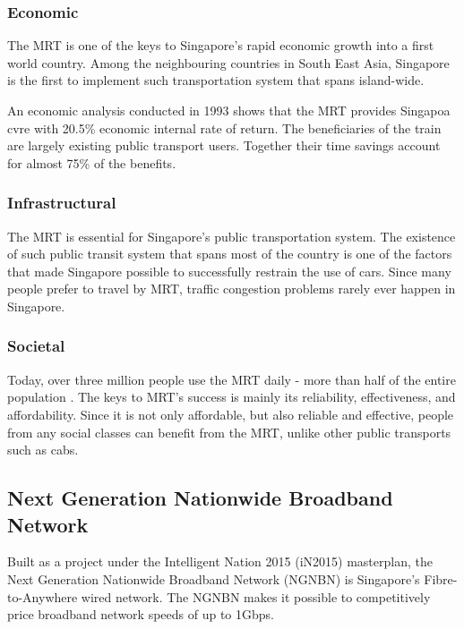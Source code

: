 \documentclass[a4paper,10pt]{article}
\begin{document}
\subsubsection{Economic}
The MRT is one of the keys to Singapore's rapid economic growth into a first world country. Among the neighbouring countries in South East Asia, Singapore is the first to implement such transportation system that spans island-wide.

An economic analysis\cite{fouracre1993mass} conducted in 1993 shows that the MRT provides Singapoa cvre with 20.5\% economic internal rate of return. The beneficiaries of the train are largely existing public transport users. Together their time savings account for almost 75\% of the benefits.

\subsubsection{Infrastructural}

The MRT is essential for Singapore's public transportation system. The existence of such public transit system that spans most of the country is one of the factors that made Singapore possible to successfully restrain the use of cars. Since many people prefer to travel by MRT, traffic congestion problems rarely ever happen in Singapore.

\subsubsection{Societal}

Today, over three million people use the MRT daily - more than half of the entire population \cite{ltaridership}. The keys to MRT's success is mainly its reliability, effectiveness, and affordability. Since it is not only affordable, but also reliable and effective, people from any social classes can benefit from the MRT, unlike other public transports such as cabs.


\subsection{Next Generation Nationwide Broadband Network}

Built as a project under the Intelligent Nation 2015 (iN2015) masterplan, the Next Generation Nationwide Broadband Network (NGNBN) is Singapore's Fibre-to-Anywhere wired network. The NGNBN makes it possible to competitively price broadband network speeds of up to 1Gbps.
\end{document}
